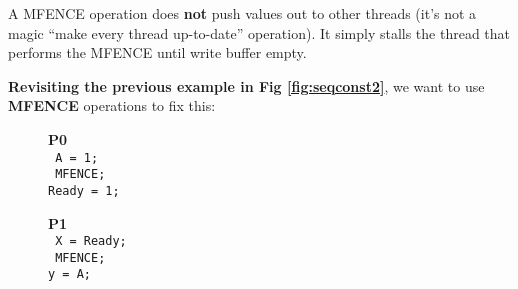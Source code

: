 \par A MFENCE operation does \textbf{not} push values out to other threads (it's not a magic \enquote{make every thread up-to-date} operation). It simply stalls the thread that performs the MFENCE until write buffer empty.
\par \textbf{Revisiting the previous example in Fig \ref{fig:seqconst2}}, we want to use \textbf{MFENCE} operations to fix this:
\begin{figure}[h]
    \begin{minipage}[t]{0.5\textwidth}
        \begin{center}
            \textbf{P0}\\
            \texttt{
            A = 1;\\
            {\color{green} MFENCE};\\
            Ready = 1;
            }
        \end{center}
    \end{minipage}
    \begin{minipage}[t]{0.5\textwidth}
        \begin{center}
            \textbf{P1}\\
            \bigskip
            \texttt{
            X = Ready;\\
            {\color{green} MFENCE};\\
            y = A;
            }
        \end{center}
    \end{minipage}
    \caption{}
    \label{fig:brokenexample1}
\end{figure}
%
\clearpage
%
